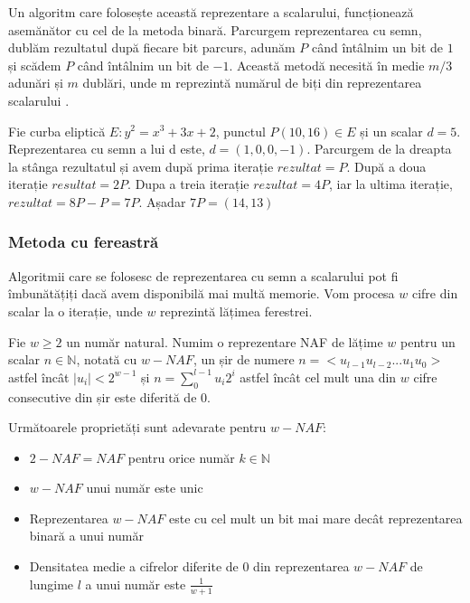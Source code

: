 Un algoritm care folosește această reprezentare a scalarului, funcționează asemănător cu cel de la metoda binară. Parcurgem reprezentarea cu semn, dublăm rezultatul după fiecare bit parcurs, adunăm $P$ când întâlnim un bit de $1$ și scădem $P$ când întâlnim un bit de $-1$. Această metodă necesită în medie $m/3$ adunări și $m$ dublări, unde m reprezintă numărul de biți din reprezentarea scalarului \cite{nafCost}.

\begin{ex}
Fie curba eliptică $E: y^2 = x^3 + 3x + 2$, punctul $P(10, 16)\in E$ și un scalar $d = 5$. Reprezentarea cu semn a lui d este, $d = (1, 0, 0, -1)$. Parcurgem de la dreapta la stânga rezultatul și avem după prima iterație $rezultat = P$. După a doua iterație $resultat = 2P$. Dupa a treia iterație $rezultat = 4P$, iar la ultima iterație, $rezultat= 8P - P= 7P$. Așadar $7P = (14, 13)$
\end{ex}

\subsubsection{Metoda cu fereastră}

Algoritmii care se folosesc de reprezentarea cu semn a scalarului pot fi îmbunătățiți dacă avem disponibilă mai multă memorie. Vom procesa $w$ cifre din scalar la o iterație, unde $w$ reprezintă lățimea ferestrei.

\begin{dfn}
Fie $w\geq 2$ un număr natural. Numim o reprezentare NAF de lățime $w$ pentru un scalar $n\in\mathbb{N}$, notată cu $w-NAF$, un șir de numere $n = <u_{l-1}u_{l-2}...u_1u_0>$ astfel încât $|u_i| < 2^{w-1}$ și $n = \sum_{0}^{l-1}u_i2^i$ astfel încât cel mult una din $w$ cifre consecutive din șir este diferită de 0.
\end{dfn}

\begin{teo}
Următoarele proprietăți sunt adevarate pentru $w-NAF$:
\begin{itemize}
\item $2-NAF = NAF$ pentru orice număr $k\in\mathbb{N}$
\item $w-NAF$ unui număr este unic
\item Reprezentarea $w-NAF$ este cu cel mult un bit mai mare decât reprezentarea binară a unui număr
\item Densitatea medie a cifrelor diferite de $0$ din reprezentarea $w-NAF$ de lungime $l$ a unui număr este $\frac{1}{w+1}$
\end{itemize}
\end{teo}

